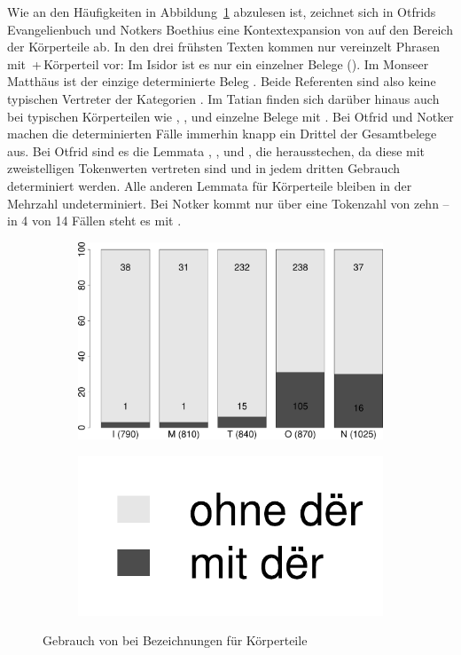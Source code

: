 Wie an den Häufigkeiten in Abbildung~\ref{fig:bel-koerper} abzulesen ist, zeichnet sich in Otfrids Evangelienbuch und Notkers Boethius eine  Kontextexpansion  von  auf den Bereich der Körperteile ab. 
In den drei frühsten Texten kommen nur vereinzelt Phrasen mit \,+\,Körperteil vor: Im Isidor ist es nur ein einzelner Belege (). Im Monseer Matthäus ist der einzige determinierte Beleg . Beide Referenten sind also keine typischen Vertreter der Kategorien . Im Tatian finden sich darüber hinaus auch bei typischen Körperteilen wie , ,   und  einzelne Belege mit . Bei Otfrid und Notker machen die determinierten Fälle immerhin knapp ein Drittel der Gesamtbelege aus. Bei Otfrid sind es die Lemmata  ,  ,   und , die herausstechen, da diese mit zweistelligen Tokenwerten vertreten sind und in jedem dritten Gebrauch determiniert werden. Alle anderen Lemmata  für Körperteile bleiben in der Mehrzahl undeterminiert. Bei Notker kommt nur  über eine Tokenzahl von zehn -- in 4 von 14 Fällen steht es mit .

\begin{figure}
\begin{subfigure}[c]{.75\linewidth}
  \includegraphics[width=\linewidth]{generated/images/koerper}
\end{subfigure}%
\begin{subfigure}[c]{.2\linewidth}
  \includegraphics[width=.85\linewidth]{generated/images/ort-legende}
\end{subfigure}

\caption{Gebrauch von  bei Bezeichnungen für Körperteile}
\label{fig:bel-koerper}
\end{figure}

